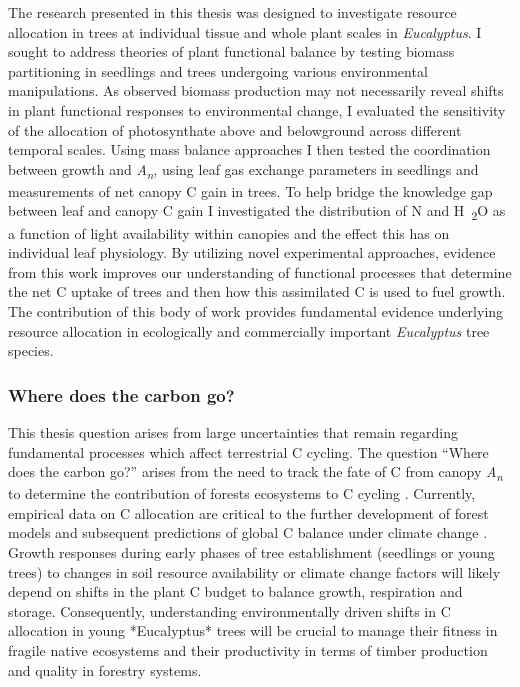 \documentclass[a4paper]{article}\usepackage[]{graphicx}\usepackage[]{color}
\begin{document}
The research presented in this thesis was designed to investigate resource allocation in trees at individual tissue and whole plant scales in \textit{Eucalyptus}. I sought to address theories of plant functional balance by testing biomass partitioning in seedlings and trees undergoing various environmental manipulations. As observed biomass production may not necessarily reveal shifts in plant functional responses to environmental change, I evaluated the sensitivity of the allocation of photosynthate above and belowground across different temporal scales. Using mass balance approaches I then tested the coordination between growth and \textit{A\textsubscript{n}}, using leaf gas exchange parameters in seedlings and measurements of net canopy C gain in trees. To help bridge the knowledge gap between leaf and canopy C gain I investigated the distribution of N and H~\textsubscript{2}O as a function of light availability within canopies and the effect this has on individual leaf physiology. By utilizing novel experimental approaches, evidence from this work improves our understanding of functional processes that determine the net C uptake of trees and then how this assimilated C is used to fuel growth. The contribution of this body of work provides fundamental evidence underlying resource allocation in ecologically and commercially important \textit{Eucalyptus} tree species.

\subsubsection*{Where does the carbon go?}
This thesis question arises from large uncertainties that remain regarding fundamental processes which affect terrestrial C cycling.  The question “Where does the carbon go?” arises from the need to track the fate of C from canopy \textit{A\textsubscript{n}} to determine the contribution of forests ecosystems to C cycling \citep{litton2007carbon}. Currently, empirical data on C allocation are critical to the further development of forest models and subsequent predictions of global C balance under climate change \citep{franklin2012modeling}. Growth responses during early phases of tree establishment (seedlings or young trees) to changes in soil resource availability or climate change factors will likely depend on shifts in the plant C budget to balance growth, respiration and storage. Consequently, understanding environmentally driven shifts in C allocation in young *Eucalyptus* trees will be crucial to manage their fitness in fragile native ecosystems and their productivity in terms of timber production and quality in forestry systems.
\end{document}

